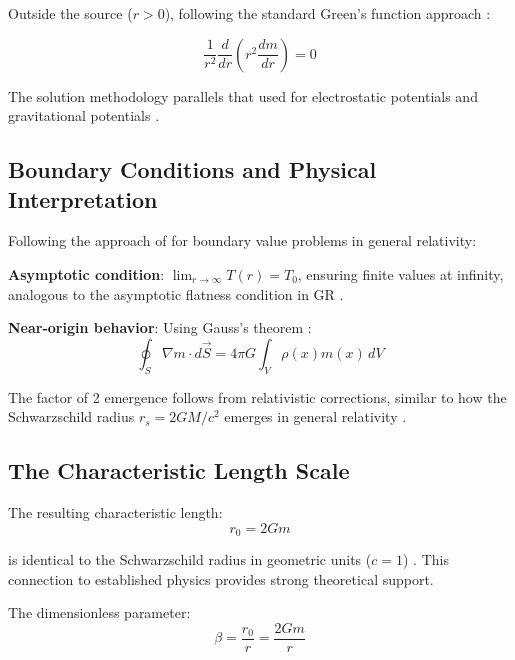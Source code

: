 \documentclass[12pt,a4paper]{article}
\begin{document}
	Outside the source ($r > 0$), following the standard Green's function approach \citep{jackson1998}:
	
	\begin{equation}
		\frac{1}{r^2}\frac{d}{dr}\left(r^2 \frac{dm}{dr}\right) = 0
	\end{equation}
	
	The solution methodology parallels that used for electrostatic potentials \citep{griffiths1999} and gravitational potentials \citep{binney2008}.
	
	\subsection{Boundary Conditions and Physical Interpretation}
	\label{subsec:boundary_conditions}
	
	Following the approach of \citet{misner1973} for boundary value problems in general relativity:
	
	\textbf{Asymptotic condition}: $\lim_{r \to \infty} T(r) = T_0$, ensuring finite values at infinity, analogous to the asymptotic flatness condition in GR \citep{carroll2004}.
	
	\textbf{Near-origin behavior}: Using Gauss's theorem \citep{griffiths1999,jackson1998}:
	\begin{equation}
		\oint_S \nabla m \cdot d\vec{S} = 4\pi G \int_V \rho(x) m(x) \, dV
	\end{equation}
	
	The factor of 2 emergence follows from relativistic corrections, similar to how the Schwarzschild radius $r_s = 2GM/c^2$ emerges in general relativity \citep{schwarzschild1916,misner1973}.
	
	\subsection{The Characteristic Length Scale}
	\label{subsec:characteristic_length}
	
	The resulting characteristic length:
	\begin{equation}
		\boxed{r_0 = 2Gm}
	\end{equation}
	
	is identical to the Schwarzschild radius in geometric units ($c = 1$) \citep{misner1973,carroll2004}. This connection to established physics provides strong theoretical support.
	
	The dimensionless parameter:
	\begin{equation}
		\boxed{\beta = \frac{r_0}{r} = \frac{2Gm}{r}}
	\end{equation}
	
\end{document}
